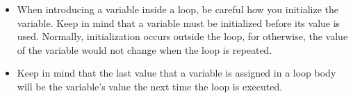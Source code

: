 \documentclass[a4paper,10pt,twoside]{book}
\begin{document}
\begin{itemize}
	\item When introducing a variable inside a loop, be careful how you initialize the variable. 
Keep in mind that a variable must be initialized before its value is used. Normally, initialization occurs outside the loop, for otherwise, the value of the variable would not change when the loop is repeated. 
\item Keep in mind that the last value that a variable is assigned in a loop body will be the 
variable’s value the next time the loop is executed.
\end{itemize}


\ifx\wholebook\relax\else
    
\end{document}
